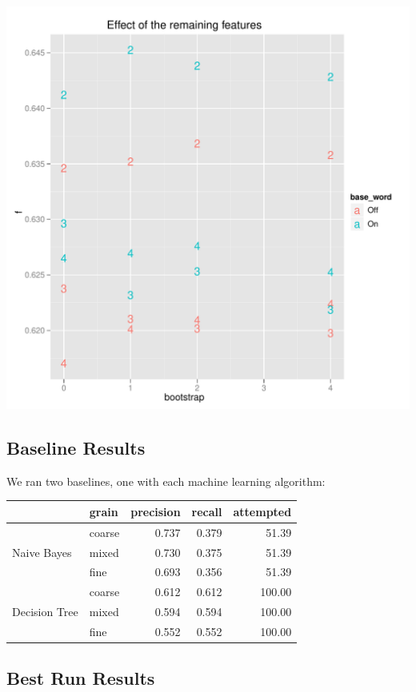 \documentclass{article}
\begin{document}
\includegraphics[width=\textwidth]{pg_0004}

\subsection{Baseline Results}

We ran two baselines, one with each machine learning algorithm:

\begin{tabular}{l l | r r r}
& grain& precision& recall& attempted\\
\hline
\multirow{3}{*}{Naive Bayes} &
coarse  &  0.737 & 0.379 &   51.39\\
&mixed  &  0.730 & 0.375 &   51.39\\
& fine  &  0.693 & 0.356 &   51.39\\
\multirow{3}{*}{Decision Tree} &
coarse  &  0.612 & 0.612 &  100.00\\
&mixed  &  0.594 & 0.594 &  100.00\\
& fine  &  0.552 & 0.552 &  100.00\\
\end{tabular}

\subsection{Best Run Results}
\end{document}
